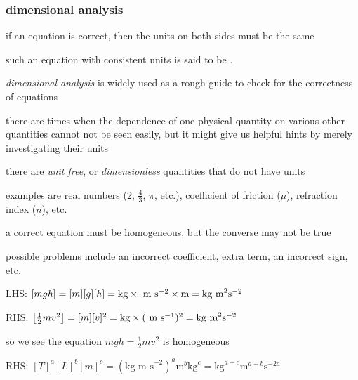 \subsubsection{dimensional analysis}

\begin{ilight}
	if an equation is correct, then the units on both sides must be the same
	
	such an equation with consistent units is said to be .
\end{ilight}

\emph{dimensional analysis} is widely used as a rough guide to check for the correctness of equations

there are times when the dependence of one physical quantity on various other quantities cannot not be seen easily, but it might give us helpful hints by merely investigating their units

\cmt there are \emph{unit free}, or \emph{dimensionless} quantities that do not have units

examples are real numbers (2, $\frac{4}{3}$, $\pi$, etc.), coefficient of friction ($\mu$), refraction index ($n$), etc.

\cmt a correct equation must be homogeneous, but the converse may not be true

possible problems include an incorrect coefficient, extra term, an incorrect sign, etc.

	
\sol LHS: $[mgh]=[m][g][h] = \text{kg} \times \text{ m s$^{-2}$} \times \text{m} = \text{kg m}^2\text{s}^{-2}$
	
	RHS: $\left[\frac{1}{2}mv^2\right] = [m][v]^2 = \text{kg} \times (\text{ m s$^{-1}$})^2 = \text{kg m}^2\text{s}^{-2}$
	
	so we see the equation $mgh = \frac{1}{2}mv^2$ is homogeneous \eoe
	

\sol RHS: $[T]^a [L]^b [m]^c = (\text{kg m s}^{-2})^a \text{m}^b \text{kg}^c = \text{kg}^{a+c} \text{m}^{a+b} \text{s}^{-2a}$

